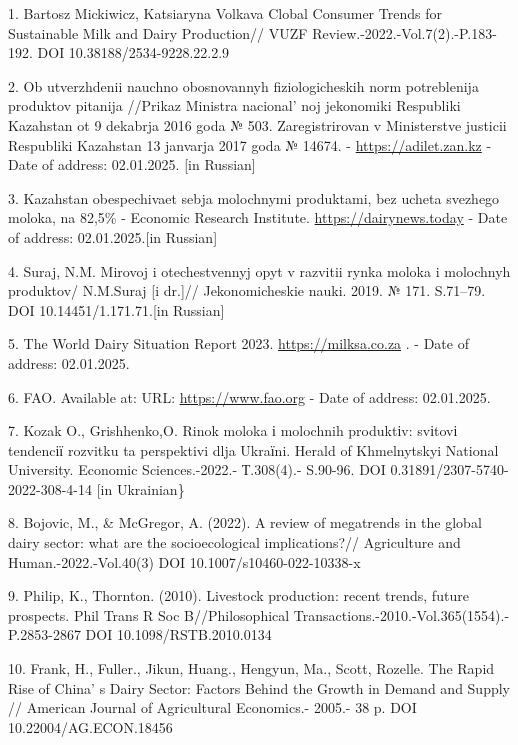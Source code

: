 \begin{references}
1. Bartosz Mickiwicz, Katsiaryna Volkava Clobal Consumer Trends for
Sustainable Milk and Dairy Produc\-tion// VUZF
Review.-2022.-Vol.7(2).-P.183-192. DOI 10.38188/2534-9228.22.2.9

2. Ob utverzhdenii nauchno obosnovannyh fiziologicheskih norm
potreblenija produktov pitanija //Prikaz Ministra
nacional' noj jekonomiki Respubliki Kazahstan ot 9
dekabrja 2016 goda № 503. Zaregistrirovan v Ministerstve justicii
Respubliki Kazahstan 13 janvarja 2017 goda № 14674. -
\href{https://adilet.zan.kz/rus/docs/V1600014674}{https://adilet.zan.kz} - Date of address:
02.01.2025. {[}in Russian{]}

3. Kazahstan obespechivaet sebja molochnymi produktami, bez ucheta
svezhego moloka, na 82,5\% - Econ\-omic Research Institute.
\href{https://dairynews.today/kz/news/kazakhstan-obespechivaet-sebya-molochnymi-produktami-bez-ucheta-svezhego-moloka-na-82-5-economic-res.html}{https://dairynews.today} -
Date of address: 02.01.2025.{[}in Russian{]}

4. Suraj, N.M. Mirovoj i otechestvennyj opyt v razvitii rynka moloka i
molochnyh produktov/ N.M.Suraj {[}i dr.{]}// Jekonomicheskie nauki.
2019. № 171. S.71--79. DOI 10.14451/1.171.71.{[}in Russian{]}

5. The World Dairy Situation Report 2023.
\href{https://milksa.co.za/sites/default/files/2024-01/2023\%20World\%20Dairy\%20Situation\%20Report.pdf}{https://milksa.co.za} .
- Date of address: 02.01.2025.

6. FAO. Available at: URL: \href{https://www.fao.org/statistics/en}{https://www.fao.org} - Date of
address: 02.01.2025.

7. Kozak O., Grishhenko,O. Rinok moloka і molochnih produktіv: svіtovі
tendencії rozvitku ta perspektivi dlja Ukraїni. Herald of Khmelnytskyi
National University. Economic Sciences.-2022.- Т.308(4).- S.90-96. DOI
0.31891/2307-5740-2022-308-4-14 {[}in Ukrainian\}

8. Bojovic, M., \& McGregor, A. (2022). A review of megatrends in the
global dairy sector: what are the socioecological implications?//
Agriculture and Human.-2022.-Vol.40(3) DOI 10.1007/s10460-022-10338-x

9. Philip, K., Thornton. (2010). Livestock production: recent trends,
future prospects. Phil Trans R Soc B//Philosophical
Transactions.-2010.-Vol.365(1554).-P.2853-2867
DOI 10.1098/RSTB.2010.0134

10. Frank, H., Fuller., Jikun, Huang., Hengyun, Ma., Scott, Rozelle. The
Rapid Rise of China' s Dairy Sector: Factors Behind the
Growth in Demand and Supply // American Journal of Agricultural
Economics.- 2005.- 38 p. DOI 10.22004/AG.ECON.18456


\end{references}
